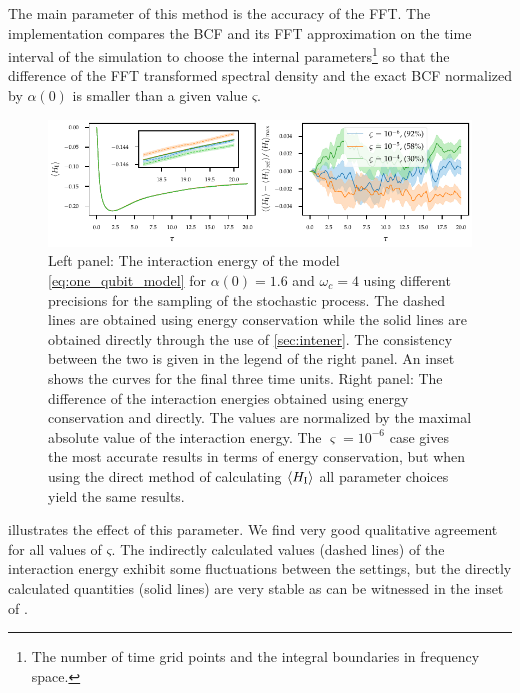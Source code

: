 The main parameter of this method is the accuracy of the FFT. The
implementation compares the BCF and its FFT approximation on the time
interval of the simulation to choose the internal
parameters\footnote{The number of time grid points and the integral
  boundaries in frequency space.} so that the difference of the FFT
transformed spectral density and the exact BCF normalized by \(α(0)\)
is smaller than a given value \(ς\).

\begin{figure}[htp]
  \centering
  \includegraphics{figs/one_bath_syst/stocproc_systematics_interaction}
  \caption{\label{fig:stocproc_systematics} Left panel: The
    interaction energy of the model \cref{eq:one_qubit_model} for
    \(α(0)=1.6\) and \(ω_c=4\) using different precisions for the
    sampling of the stochastic process. The dashed lines are obtained
    using energy conservation while the solid lines are obtained
    directly through the use of \cref{sec:intener}. The consistency between
    the two is given in the legend of the right panel. An inset shows
    the curves for the final three time units. Right panel: The
    difference of the interaction energies obtained using energy
    conservation and directly. The values are normalized by the
    maximal absolute value of the interaction energy. The
    \(\varsigma = 10^{-6}\) case gives the most accurate results in
    terms of energy conservation, but when using the direct method of
    calculating \(\ev{H_{\inter}}\) all parameter choices yield the
    same results.}
\end{figure}
 illustrates the effect of this
parameter. We find very good qualitative agreement for all values of
\(ς\). The indirectly calculated values (dashed lines) of the
interaction energy exhibit some fluctuations between the settings, but
the directly calculated quantities (solid lines) are very stable as can
be witnessed in the inset of .


